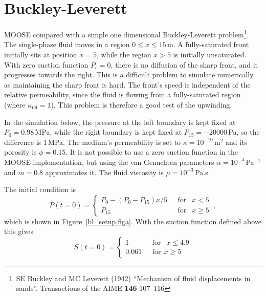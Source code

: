 \documentclass[]{scrreprt}
\begin{document}
\chapter{Buckley-Leverett}
\label{bl}

MOOSE compared with a simple one dimensional Buckley-Leverett
problem\footnote{SE Buckley and MC Leverett (1942) ``Mechanism of
  fluid displacements in sands''.  Transactions of the AIME {\bf 146}
  107--116}.  The single-phase fluid moves in a region $0\leq x\leq
15$\,m.  A fully-saturated front initially sits at position $x=5$,
while the region $x>5$ is initially unsaturated.  With zero suction
function $P_{c} = 0$, there is no diffusion of the sharp front, and it
progresses towards the right.  This is a difficult problem to simulate
numerically as maintaining the sharp front is hard.  The front's speed
is independent of the relative permeability, since the fluid is
flowing from a fully-saturated region (where
$\kappa_{\mathrm{rel}}=1$).  This problem is therefore a good test of
the upwinding.


In the simulation below, the pressure at the left boundary is kept
fixed at $P_{0}=0.98$\,MPa, while the right boundary is kept fixed at
$P_{15}=-20000$\,Pa, so the difference is 1\,MPa.  The medium's
permeability is set to $\kappa = 10^{-10}\,\mathrm{m}^{2}$ and its
porosity is $\phi = 0.15$.  It is not possible to use a zero suction
function in the MOOSE implementation, but using the van Genuchten
parameters $\alpha = 10^{-4}$\,Pa$^{-1}$ and $m=0.8$ approximates it.
The fluid viscosity is $\mu = 10^{-3}$\,Pa.s.

The initial condition is
\begin{equation}
P(t=0) = \left\{
\begin{array}{ll}
P_{0} - (P_{0}-P_{15})x/5 & \ \ \ \mbox{for }\ \ x<5 \\
P_{15} & \ \ \ \mbox{for }\ \ x\geq 5  
\end{array}
\right. \ ,
\end{equation}
which is shown in
Figure~\ref{bl_setup.figa}.  With the suction function defined above
this gives
\begin{equation}
S(t=0) = \left\{
\begin{array}{ll}
1 & \ \ \ \mbox{for }\ \ x\leq 4.9 \\
0.061 & \ \ \ \mbox{for} \ \ x \geq 5
\end{array}
\right.
\end{equation}
\end{document}

